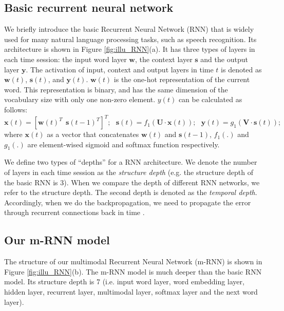 \subsection{Basic recurrent neural network}
We briefly introduce the basic Recurrent Neural Network (RNN) \cite{elman1990finding,mikolov2010recurrent,mikolov2011extensions} that is widely used for many natural language processing tasks, such as speech recognition.
Its architecture is shown in Figure \ref{fig:illu_RNN}(a).
It has three types of layers in each time session: the input word layer $\mathbf{w}$, the context layer $\mathbf{s}$ and the output layer $\mathbf{y}$.
The activation of input, context and output layers in time $t$ is denoted as $\mathbf{w}(t)$, $\mathbf{s}(t)$, and $\mathbf{y}(t)$.
$\mathbf{w}(t)$ is the one-hot representation of the current word. 
This representation is binary, and has the same dimension of the vocabulary size with only one non-zero element.
$y(t)$ can be calculated as follows:
\begin{equation}
\mathbf{x}(t) = [\mathbf{w}(t)^T\ \ \mathbf{s}(t-1)^T]^T;\ \ \ 
\mathbf{s}(t)=f_1(\mathbf{U} \cdot \mathbf{x}(t));\ \ \ 
\mathbf{y}(t)=g_1(\mathbf{V} \cdot \mathbf{s}(t));
\end{equation}
where $\mathbf{x}(t)$ as a vector that concatenates $\mathbf{w}(t)$ and $\mathbf{s}(t-1)$, $f_1(.)$ and $g_1(.)$ are element-wised sigmoid and softmax function respectively.

We define two types of ``depths'' for a RNN architecture. 
We denote the number of layers in each time session as the \emph{structure depth} (e.g. the structure depth of the basic RNN is 3).
When we compare the depth of different RNN networks, we refer to the structure depth.
The second depth is denoted as the \emph{temporal depth}. 
Accordingly, when we do the backpropagation, we need to propagate the error through recurrent connections back in time \cite{rumelhart1988learning}.

\subsection{Our m-RNN model}
The structure of our multimodal Recurrent Neural Network (m-RNN) is shown in Figure \ref{fig:illu_RNN}(b).
The m-RNN model is much deeper than the basic RNN model.
Its structure depth is 7 (i.e. input word layer, word embedding layer, hidden layer, recurrent layer, multimodal layer, softmax layer and the next word layer).

